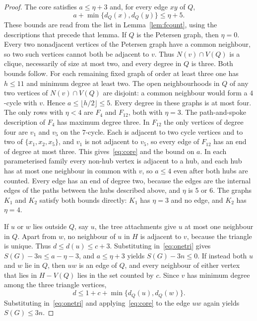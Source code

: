 \documentclass[ASNA]{USG}
\theoremstyle{WBstyletwo}
\numberwithin{equation}{section}
\begin{document}
\begin{proof}
The core satisfies $a\le\eta+3$ and, for every edge $xy$ of $Q$,
\begin{equation}\label{eq:core}
a+\min\{d_Q(x),d_Q(y)\}\le\eta+5.
\end{equation}
These bounds are read from the list in Lemma~\ref{lem:fcount}, using the descriptions that precede that lemma. If $Q$ is the Petersen graph, then $\eta=0$. Every two nonadjacent vertices of the Petersen graph have a common neighbour, so two such vertices cannot both be adjacent to $v$. Thus $N(v)\cap V(Q)$ is a clique, necessarily of size at most two, and every degree in $Q$ is three. Both bounds follow. For each remaining fixed graph of order at least three one has $h\le 11$ and minimum degree at least two. The open neighbourhoods in $Q$ of any two vertices of $N(v)\cap V(Q)$ are disjoint: a common neighbour would form a $4$-cycle with $v$. Hence $a\le\lfloor h/2\rfloor\le 5$. Every degree in these graphs is at most four. The only rows with $\eta<4$ are $F_4$ and $F_{12}$, both with $\eta=3$. The path-and-spoke description of $F_4$ has maximum degree three. In $F_{12}$ the only vertices of degree four are $v_1$ and $v_5$ on the $7$-cycle. Each is adjacent to two cycle vertices and to two of $\{x_1,x_2,x_5\}$, and $v_1$ is not adjacent to $v_5$, so every edge of $F_{12}$ has an end of degree at most three. This gives~\eqref{eq:core} and the bound on $a$. In each parameterised family every non-hub vertex is adjacent to a hub, and each hub has at most one neighbour in common with $v$, so $a\le 4$ even after both hubs are counted. Every edge has an end of degree two, because the edges are the internal edges of the paths between the hubs described above, and $\eta$ is $5$ or $6$. The graphs $K_1$ and $K_2$ satisfy both bounds directly: $K_1$ has $\eta=3$ and no edge, and $K_2$ has $\eta=4$.

If $u$ or $w$ lies outside $Q$, say $u$, the tree attachments give $u$ at most one neighbour in $Q$. Apart from $w$, no neighbour of $u$ in $H$ is adjacent to $v$, because the triangle is unique. Thus $d\le d(u)\le c+3$. Substituting in~\eqref{eq:onetri} gives $S(G)-3n\le a-\eta-3$, and $a\le\eta+3$ yields $S(G)-3n\le 0$. If instead both $u$ and $w$ lie in $Q$, then $uw$ is an edge of $Q$, and every neighbour of either vertex that lies in $H-V(Q)$ lies in the set counted by $c$. Since $v$ has minimum degree among the three triangle vertices,
\[
d\le 1+c+\min\{d_Q(u),d_Q(w)\}.
\]
Substituting in~\eqref{eq:onetri} and applying~\eqref{eq:core} to the edge $uw$ again yields $S(G)\le 3n$.
\end{proof}
\end{document}
